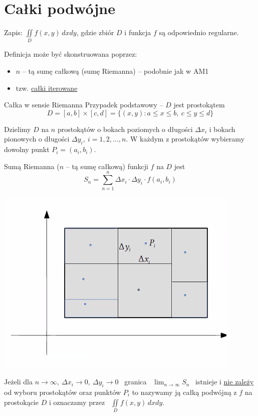 \section{Całki podwójne}

Zapis: $ \iint\limits_{D} f(x,y)\, dxdy $, gdzie zbiór $D$ i funkcja $f$ są odpowiednio regularne.

Definicja może być skonstruowana poprzez:
\begin{itemize}
    \item $n$ -- tą sumę całkową (sumę Riemanna) -- podobnie jak w AM1
    \item tzw. \underline{całki iterowane}
\end{itemize}
\bigskip

\begin{tw}{Całka w sensie Riemanna}
Przypadek podstawowy -- $D$ jest prostokątem
\[ D = [a,b] \times [c,d] = \{ (x,y): a \leq x \leq b, \ c \leq y \leq d \} \]

Dzielimy $D$ na $n$ prostokątów o bokach poziomych o długości $\Delta x_i$ i bokach pionowych o długości $\Delta y_i, \ i = 1,2,...,n$.
W każdym z prostokątów wybieramy dowolny punkt $P_i = (a_i, b_i)$.

Sumą Riemanna ($n$ -- tą sumę całkową) funkcji $f$ na $D$ jest
\[ S_n = \sum\limits_{n=1}^{n} \Delta x_i \cdot \Delta y_i \cdot f(a_i, b_i) \]
\end{tw}

\begin{center}
    \includegraphics[scale=0.8]{img/prostokat1.png}
\end{center}

Jeżeli dla $ n \to \infty, \ \Delta x_i \to 0, \ \Delta y_i \to 0 $ \ granica \ $ \lim_{n \to \infty} S_n $ \ istnieje i \underline{nie zależy}
od wyboru prostokątów oraz punktów $P_i$ to nazywamy ją całką podwójną z $f$ na prostokącie $D$ i oznaczamy przez \ $ \iint\limits_D f(x,y) \, dxdy $.
\bigskip

